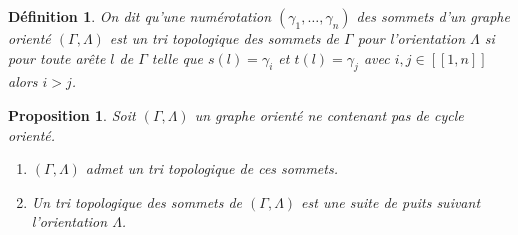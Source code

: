 \documentclass[a4paper,11pt]{article}
\newtheorem{defi}[thm]{Définition}%
\newtheorem{prop}[thm]{Proposition}%
\begin{document}
\begin{defi}
	On dit qu'une numérotation $(\gamma_{1}, \dots, \gamma_{n})$ des sommets d'un graphe orienté $(\Gamma,\Lambda)$ est un \emph{tri topologique} des sommets de $\Gamma$ pour l'orientation $\Lambda$ si pour toute arête $l$ de $\Gamma$ telle que $s(l) = \gamma_{i}$ et $t(l) = \gamma_{j}$ avec  $i,j \in [\![1,n]\!]$ alors $i>j$.
\end{defi}
\begin{prop}
\label{tri-topo}
Soit $(\Gamma,\Lambda)$ un graphe orienté ne contenant pas de cycle orienté.
  \begin{enumerate}
  \item $(\Gamma,\Lambda)$ admet un tri topologique de ces sommets.
  \item Un tri topologique des sommets de $(\Gamma,\Lambda)$ est une suite de puits suivant l'orientation $\Lambda$.
  \end{enumerate}
\end{prop}
\end{document}
